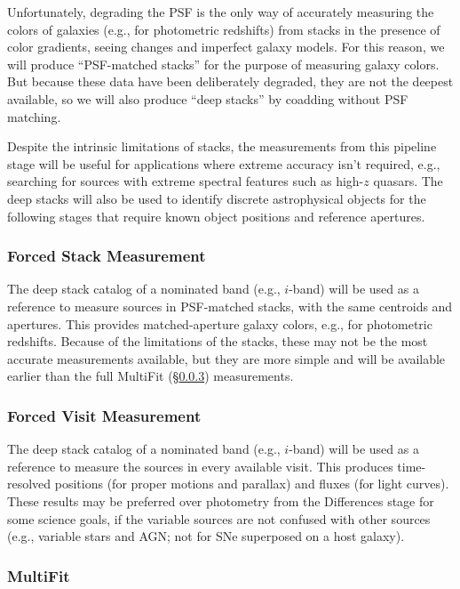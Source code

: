 \documentclass[12pt]{article}
\begin{document}
Unfortunately, degrading the PSF is the only way of accurately measuring the colors of galaxies (e.g., for
photometric redshifts) from stacks in the presence of color gradients, seeing changes and imperfect galaxy
models.  For this reason, we
will produce ``PSF-matched stacks'' for the purpose of measuring galaxy colors.  But because these data have
been deliberately degraded, they are not the deepest available, so we will also produce ``deep stacks'' by
coadding without PSF matching.

Despite the intrinsic limitations of stacks, the measurements from this pipeline stage will be useful for
applications where extreme accuracy isn't required, e.g., searching for sources with extreme spectral features
such as high-$z$ quasars.  The deep stacks will also be used to identify discrete astrophysical objects for
the following stages that require known object positions and reference apertures.

\subsubsection{Forced Stack Measurement}

The deep stack catalog of a nominated band (e.g., $i$-band) will be used as a reference to measure sources in
PSF-matched stacks, with the same centroids and apertures.  This provides matched-aperture galaxy colors,
e.g., for photometric redshifts.  Because of the limitations of the stacks, these may not be the most accurate
measurements available, but they are more simple and will be available earlier than the full MultiFit
(\S\ref{flow:multifit}) measurements.

\subsubsection{Forced Visit Measurement}

The deep stack catalog of a nominated band (e.g., $i$-band) will be used as a reference to measure the sources in
every available visit.  This produces time-resolved positions (for proper motions and parallax) and fluxes
(for light curves).  These results may be preferred over photometry from the Differences stage for some
science goals, if the variable sources are not confused with other sources (e.g., variable stars and AGN;
not for SNe superposed on a host galaxy).

\subsubsection{MultiFit}
\label{flow:multifit}
\end{document}
